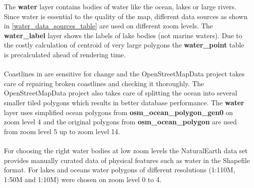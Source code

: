 \noindent\begin{minipage}[t]{0.48\linewidth}
    \vspace{0pt}
    The \textbf{water} layer contains bodies of water like the ocean, lakes or large rivers.
    Since water is essential to the quality of the map, different data sources as shown in \autoref{water_data_sources_table} are used on different zoom levels. 
    The \textbf{water\_label} layer shows the labels of lake bodies (not marine waters). Due to the costly calculation of centroid of very large polygons the \textbf{water\_point} table is precalculated ahead of rendering time.
    \\\\
    Coastlines in \osm{} are sensitive for change and
    the OpenStreetMapData\cite{14_openstreetmapdata.com_2015}
    project takes care of repairing broken coastlines and checking it thoroughly. The OpenStreetMapData project also takes care of splitting the ocean into several smaller tiled polygons which results in better database performance.
    The \textbf{water} layer uses simplified ocean polygons from \textbf{osm\_ocean\_polygon\_gen0} on zoom level 4 and the original polygons from \textbf{osm\_ocean\_polygon} are used from zoom level 5 up to zoom level 14.
    \\\\
    For choosing the right water bodies at low zoom levels the NaturalEarth data set \cite{16_naturalearthdata.com_2015} provides manually curated data of physical features such as water in the Shapefile format. For lakes and oceans water polygons of different resolutions (1:110M, 1:50M and 1:10M) were chosen on zoom level 0 to 4.
\end{minipage}
\hfill
